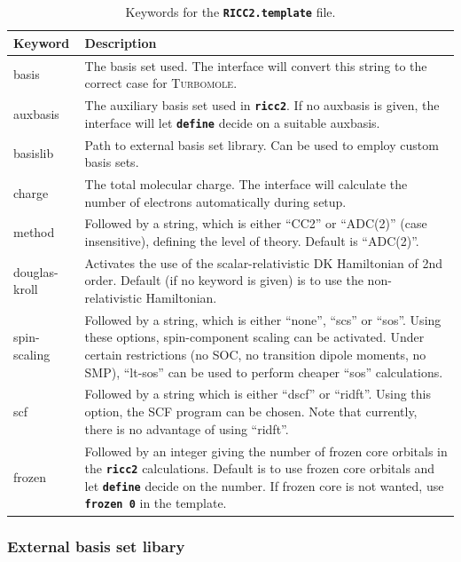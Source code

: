 \documentclass[a4paper,10pt,DIV=15,openany]{scrbook}
\newcommand{\ttt}[1]{\textbf{\texttt{#1}}}
\begin{document}
\begin{table}
  \centering
  \caption{Keywords for the \ttt{RICC2.template} file.}
  \label{tab:ricc2_temp}
  \begin{tabular}{>{\ttfamily}lp{12cm}}
  \hline
  Keyword       &Description\\
  \hline
basis           &The basis set used. The interface will convert this string to the correct case for \textsc{Turbomole}.\\
auxbasis        &The auxiliary basis set used in \ttt{ricc2}. If no auxbasis is given, the interface will let \ttt{define} decide on a suitable auxbasis.\\
basislib        &Path to external basis set library. Can be used to employ custom basis sets.\\
charge          &The total molecular charge. The interface will calculate the number of electrons automatically during setup.\\
method          &Followed by a string, which is either ``CC2'' or ``ADC(2)'' (case insensitive), defining the level of theory. Default is ``ADC(2)''.\\
douglas-kroll   &Activates the use of the scalar-relativistic DK Hamiltonian of 2nd order. Default (if no keyword is given) is to use the non-relativistic Hamiltonian.\\
spin-scaling    &Followed by a string, which is either ``none'', ``scs'' or ``sos''. Using these options, spin-component scaling can be activated. Under certain restrictions (no SOC, no transition dipole moments, no SMP), ``lt-sos'' can be used to perform cheaper ``sos'' calculations.\\
scf             &Followed by a string which is either ``dscf'' or ``ridft''. Using this option, the SCF program can be chosen. Note that currently, there is no advantage of using ``ridft''.\\
frozen          &Followed by an integer giving the number of frozen core orbitals in the \ttt{ricc2} calculations. Default is to use frozen core orbitals and let \ttt{define} decide on the number. If frozen core is not wanted, use \ttt{frozen 0} in the template.\\
  \hline
  \end{tabular}
\end{table}

\subsubsection{External basis set libary}
\end{document}
